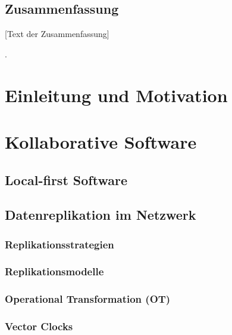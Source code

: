 \documentclass[oneside,bibliography=totocnumbered,BCOR=5mm]{scrbook}
\begin{document}
\section*{Zusammenfassung}
[Text der Zusammenfassung]


\clearpage

\tableofcontents
.

\newpage
{}

\chapter{Einleitung und Motivation}


\newpage
\chapter{Kollaborative Software}


\section{Local-first Software}




\section{Datenreplikation im Netzwerk}


\subsection{Replikationsstrategien}


\subsection{Replikationsmodelle}


\subsection{Operational Transformation (OT)}

\subsection{Vector Clocks}

\end{document}
